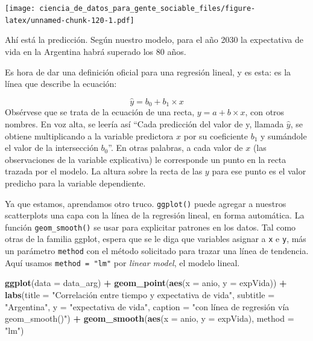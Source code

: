 \documentclass[spanish,]{book}
\newenvironment{Shaded}{\begin{snugshade}}{\end{snugshade}}
\newcommand{\DataTypeTok}[1]{\textcolor[rgb]{0.13,0.29,0.53}{#1}}
\newcommand{\KeywordTok}[1]{\textcolor[rgb]{0.13,0.29,0.53}{\textbf{#1}}}
\newcommand{\NormalTok}[1]{#1}
\newcommand{\OperatorTok}[1]{\textcolor[rgb]{0.81,0.36,0.00}{\textbf{#1}}}
\newcommand{\StringTok}[1]{\textcolor[rgb]{0.31,0.60,0.02}{#1}}
\begin{document}
\texttt{[image: ciencia\_de\_datos\_para\_gente\_sociable\_files/figure-latex/unnamed-chunk-120-1.pdf]}

Ahí está la predicción. Según nuestro modelo, para el año 2030 la expectativa de vida en la Argentina habrá superado los 80 años.

Es hora de dar una definición oficial para una regresión lineal, y es esta: es la línea que describe la ecuación:

\[ \hat{y} = b_0 + b_1 \times x \]
Obsérvese que se trata de la ecuación de una recta, \(y = a + b \times x\), con otros nombres. En voz alta, se leería así ``Cada predicción del valor de y, llamada \(\hat{y}\), se obtiene multiplicando a la variable predictora \(x\) por su coeficiente \(b_1\) y sumándole el valor de la intersección \(b_0\)''. En otras palabras, a cada valor de \(x\) (las observaciones de la variable explicativa) le corresponde un punto en la recta trazada por el modelo. La altura sobre la recta de las \(y\) para ese punto es el valor predicho para la variable dependiente.

Ya que estamos, aprendamos otro truco. \texttt{ggplot()} puede agregar a nuestros scatterplots una capa con la línea de la regresión lineal, en forma automática. La función \texttt{geom\_smooth()} se usar para explicitar patrones en los datos. Tal como otras de la familia ggplot, espera que se le diga que variables asignar a \texttt{x} e \texttt{y}, más un parámetro \texttt{method} con el método solicitado para trazar una línea de tendencia. Aquí usamos \texttt{method\ =\ "lm"} por \emph{linear model}, el modelo lineal.

\begin{Shaded}
\begin{Highlighting}[]
\KeywordTok{ggplot}\NormalTok{(}\DataTypeTok{data =}\NormalTok{ data_arg) }\OperatorTok{+}\StringTok{ }
\StringTok{    }\KeywordTok{geom_point}\NormalTok{(}\KeywordTok{aes}\NormalTok{(}\DataTypeTok{x =}\NormalTok{ anio, }\DataTypeTok{y =}\NormalTok{ expVida)) }\OperatorTok{+}
\StringTok{    }\KeywordTok{labs}\NormalTok{(}\DataTypeTok{title =} \StringTok{"Correlación entre tiempo y expectativa de vida"}\NormalTok{,}
         \DataTypeTok{subtitle =} \StringTok{"Argentina"}\NormalTok{,}
         \DataTypeTok{y =} \StringTok{"expectativa de vida"}\NormalTok{,}
         \DataTypeTok{caption =} \StringTok{"con línea de regresión vía geom_smooth()"}\NormalTok{) }\OperatorTok{+}
\StringTok{    }\KeywordTok{geom_smooth}\NormalTok{(}\KeywordTok{aes}\NormalTok{(}\DataTypeTok{x =}\NormalTok{ anio, }\DataTypeTok{y =}\NormalTok{ expVida), }\DataTypeTok{method =} \StringTok{"lm"}\NormalTok{)}
\end{Highlighting}
\end{Shaded}
\end{document}
